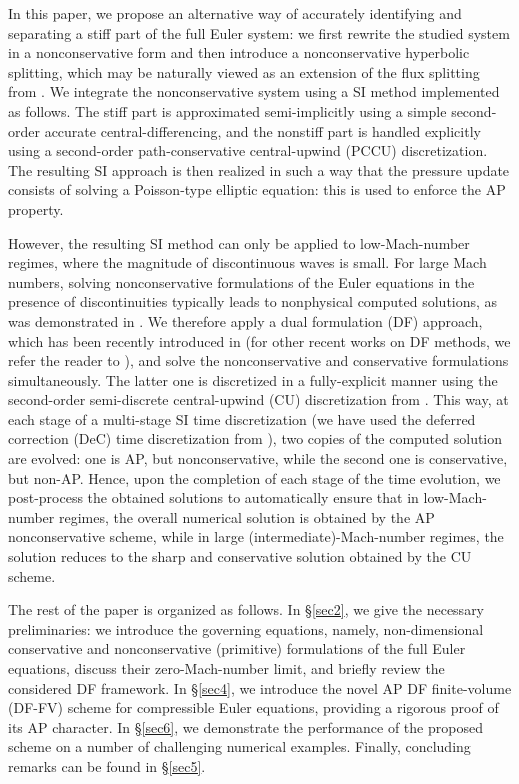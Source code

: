 \documentclass[preprint,12pt]{elsarticle}
\begin{document}
In this paper, we propose an alternative way of accurately identifying and separating a stiff part of the full Euler system: we first
rewrite the studied system in a nonconservative form and then introduce a nonconservative hyperbolic splitting, which may be naturally
viewed as an extension of the flux splitting from \cite{haack2012all}. We integrate the nonconservative system using a SI method 
implemented as follows. The stiff part is approximated semi-implicitly using a simple second-order accurate central-differencing, and the 
nonstiff part is handled explicitly using a second-order {\color{black}path-conservative central-upwind (PCCU)} discretization. The resulting
SI approach is then realized in such a way that the pressure update consists of solving a Poisson-type elliptic equation: this is used to 
enforce the AP property.

However, the resulting SI method can only be applied to low-Mach-number regimes, where the magnitude of discontinuous waves is small.
For large Mach numbers, solving nonconservative formulations of the Euler equations in the presence of discontinuities typically leads to
nonphysical computed solutions, as was demonstrated in \cite{abgrall2010comment,HouLeF}. We therefore apply a dual formulation (DF)
approach, which has been recently introduced in \cite{CFKM} (for other recent works on DF methods, we refer the reader to
\cite{Abg2023,ACKM,AbgLiu,pidatella2019semi}), and solve the nonconservative and conservative formulations simultaneously. The latter one is
discretized in a fully-explicit manner using the second-order semi-discrete central-upwind (CU) discretization from \cite{KLin}. This way,
at each stage of a multi-stage SI time discretization (we have used the deferred correction (DeC) time discretization from
\cite{offner2025analysis}), two copies of the computed solution are evolved: one is AP, but nonconservative, while the second one is
conservative, but non-AP. Hence, upon the completion of each stage of the time evolution, we post-process the obtained solutions to
automatically ensure that in low-Mach-number regimes, the overall numerical solution is obtained by the AP nonconservative scheme, while in
large (intermediate)-Mach-number regimes, the solution reduces to the sharp and conservative solution obtained by the CU scheme.

The rest of the paper is organized as follows. In \S\ref{sec2}, we give the necessary preliminaries: we introduce the governing equations,
namely, non-dimensional conservative and nonconservative (primitive) formulations of the full Euler equations, discuss their
zero-Mach-number limit, and briefly review the considered DF framework. In \S\ref{sec4}, we introduce the novel AP DF finite-volume (DF-FV)
scheme for compressible Euler equations, providing a rigorous proof of its AP character. In \S\ref{sec6}, we demonstrate the performance of
the proposed scheme on a number of challenging numerical examples. Finally, concluding remarks can be found in \S\ref{sec5}.
\end{document}
